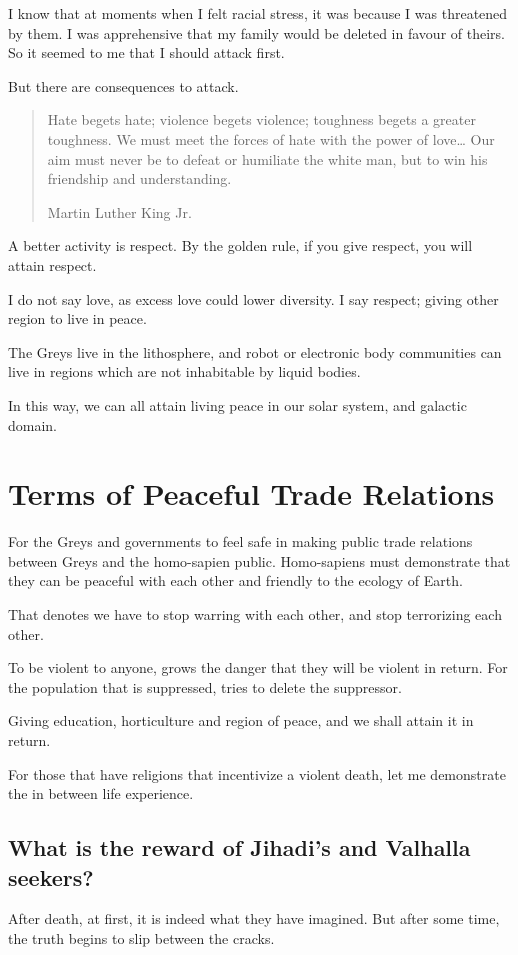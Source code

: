 I know that at moments when I felt racial stress, it was because I was
threatened by them. I was apprehensive that my family would be deleted in favour
of theirs. So it seemed to me that I should attack first. 

But there are consequences to attack.

\blockquote[Martin Luther King Jr.]{Hate begets hate; violence begets violence; 
toughness begets a greater toughness. We must meet the forces of hate with the 
power of love\ldots{} Our aim must never be to defeat or humiliate the white 
man, but to win his friendship and understanding.}

A better activity is respect. By the golden rule, if you give respect, you will
attain respect. 

I do not say love, as excess love could lower diversity. 
I say respect; giving other region to live in peace. 

The Greys live in the lithosphere, and robot or electronic body communities 
can live in regions which are not inhabitable by liquid bodies.

In this way, we can all attain living peace in our solar system, 
and galactic domain.

\section{Terms of Peaceful Trade Relations}
\label{terms}

For the Greys and governments to feel safe in making public trade relations
between Greys and the homo-sapien public.
Homo-sapiens must demonstrate that they can be peaceful with each other and
friendly to the ecology of Earth.

That denotes we have to stop warring with each other,
and stop terrorizing each other.

To be violent to anyone, grows the danger that they will be violent in return.
For the population that is suppressed, tries to delete the suppressor. 

Giving education, horticulture and region of peace, and we shall attain it in
return.

For those that have religions that incentivize a violent death, let me
demonstrate the in between life experience.

\subsection{What is the reward of Jihadi's and Valhalla seekers?}
After death, at first, it is indeed what they have imagined. 
But after some time, the truth begins to slip between the cracks. 

